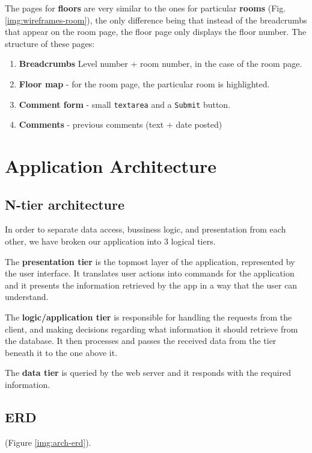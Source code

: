 \documentclass{sig-alt-release2}
\begin{document}
The pages for \textbf{floors} are very similar to the ones for particular
\textbf{rooms} (Fig. \ref{img:wireframes-room}), the only difference being that
instead of the breadcrumbs that appear on the room page, the floor page only 
displays the floor number. The structure of these pages:
\begin{enumerate} \itemsep1pt \parskip0pt 
	\item{\textbf{Breadcrumbs} Level number + room number, in the case of 
	the room page.}
	\item{\textbf{Floor map} - for the room page, the particular room is
	highlighted.}
	\item{\textbf{Comment form} - small \texttt{textarea} and a 
	\texttt{Submit} button.}
	\item{\textbf{Comments} - previous comments (text + date posted)}
\end{enumerate}


\section{Application Architecture}

\subsection*{N-tier architecture}
In order to separate data access, bussiness logic, and presentation from each
other, we have broken our application into 3 logical tiers.

The \textbf{presentation tier} is the topmost layer of the application,
represented by the user interface. It translates user actions into commands
for the application and it presents the information retrieved by the app in a
way that the user can understand.

The \textbf{logic/application tier} is responsible for handling the requests
from the client, and making decisions regarding what information it should
retrieve from the database. It then processes and passes the received data
from the tier beneath it to the one above it.

The \textbf{data tier} is queried by the web server and it responds with the required information.

\subsection*{ERD}

 (Figure \ref{img:arch-erd}).
\end{document}
